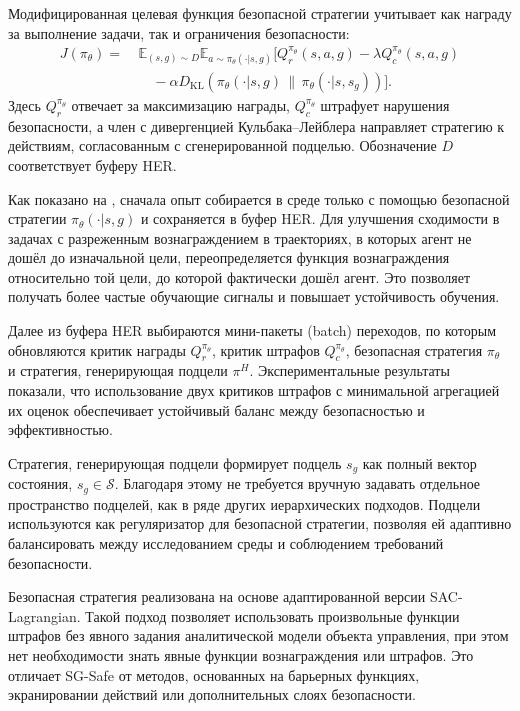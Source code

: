 Модифицированная целевая функция безопасной стратегии учитывает как награду за выполнение задачи, так и ограничения безопасности:
\begin{equation}
\label{eq:sgsafe_safe_policy_improvement}
\begin{split}
J(\pi_{\theta}) =\ &
\mathbb{E}_{(s,g)\sim D}
\mathbb{E}_{a\sim \pi_{\theta}(\cdot|s,g)}
\Big[
Q^{\pi_{\theta}}_{r}(s,a,g)
- \lambda Q^{\pi_{\theta}}_{c}(s,a,g) \\
& \quad - \alpha
D_{\mathrm{KL}}
\left(
\pi_{\theta}(\cdot|s,g)
\,\|\,
\pi_{\theta}(\cdot|s,s_g)
\right)
\Big].
\end{split}
\end{equation}
Здесь $Q_r^{\pi_\theta}$ отвечает за максимизацию награды, $Q_c^{\pi_\theta}$ штрафует нарушения безопасности, а член с дивергенцией Кульбака--Лейблера направляет стратегию к действиям, согласованным с сгенерированной подцелью. Обозначение $D$ соответствует буферу HER.

Как показано на , сначала опыт собирается в среде только с помощью безопасной стратегии $\pi_\theta(\cdot|s,g)$ и сохраняется в буфер HER. Для улучшения сходимости в задачах с разреженным вознаграждением в траекториях, в которых агент не дошёл до изначальной цели, переопределяется функция вознаграждения относительно той цели, до которой фактически дошёл агент. Это позволяет получать более частые обучающие сигналы и повышает устойчивость обучения.

Далее из буфера HER выбираются мини-пакеты (batch) переходов, по которым обновляются критик награды $Q_r^{\pi_\theta}$, критик штрафов $Q_c^{\pi_\theta}$, безопасная стратегия $\pi_\theta$ и стратегия, генерирующая подцели $\pi^H$. Экспериментальные результаты показали, что использование двух критиков штрафов с минимальной агрегацией их оценок обеспечивает устойчивый баланс между безопасностью и эффективностью.

Стратегия, генерирующая подцели формирует подцель $s_g$ как полный вектор состояния, $s_g \in \mathcal{S}$. Благодаря этому не требуется вручную задавать отдельное пространство подцелей, как в ряде других иерархических подходов. Подцели используются как регуляризатор для безопасной стратегии, позволяя ей адаптивно балансировать между исследованием среды и соблюдением требований безопасности.

Безопасная стратегия реализована на основе адаптированной версии SAC-Lagrangian. Такой подход позволяет использовать произвольные функции штрафов без явного задания аналитической модели объекта управления, при этом нет необходимости знать явные функции вознаграждения или штрафов. Это отличает SG-Safe от методов, основанных на барьерных функциях, экранировании действий или дополнительных слоях безопасности.

